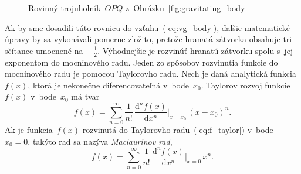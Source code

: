 \documentclass[a4paper,12pt]{book}
\newcommand{\diff}{\mathrm d}
\begin{document}
\begin{figure}
\centering

\caption{Rovinný trojuholník~$OPQ$ z~Obrázku~\ref{fig:gravitating_body}}
\label{fig:distance_l}
\end{figure}

Ak by sme dosadili túto rovnicu do vzťahu~(\ref{eq:vg_body}), ďalšie
matematické úpravy by sa vykonávali pomerne zložito, pretože hranatá zátvorka
obsahuje tri sčítance umocnené na~$-\frac{1}{2}$.  Výhodnejšie je rozvinúť
hranatú zátvorku spolu s~jej exponentom do mocninového radu.  Jeden zo spôsobov
rozvinutia funkcie do mocninového radu je pomocou Taylorovho radu.  Nech je 
daná analytická funkcia~$f(x)$, ktorá je nekonečne diferencovateľná 
v~bode~$x_0$.  Taylorov rozvoj funkcie~$f(x)$ v~bode~$x_0$ má tvar
%
\begin{equation}
\label{eq:f_taylor}
f(x) = \sum_{n = 0}^\infty \frac{1}{n!} \, \frac{\diff^n f(x)}{\diff x^n} 
\bigg\lvert_{x = x_0} \, (x - x_0)^n{.}
\end{equation}
%
Ak je funkcia~$f(x)$ rozvinutá do Taylorovho radu~(\ref{eq:f_taylor}) 
v~bode~$x_0 = 0$, takýto rad sa nazýva \emph{Maclaurinov rad},
%
\begin{equation}
f(x) = \sum_{n = 0}^\infty \frac{1}{n!} \, \frac{\diff^n f(x)}{\diff x^n} 
\bigg\lvert_{x = 0} \, x^n{.}
\end{equation}
\end{document}
